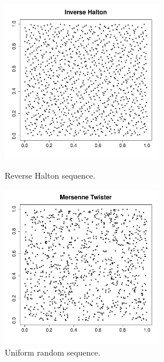 \begin{figure}[H]
  \begin{minipage}{10cm}
    \begin{center}
      \includegraphics[width=7cm]{reverseHalton_cloud.pdf}
      \caption{Reverse Halton sequence.}
      \label{ReverseHalton}
    \end{center}
  \end{minipage}
  \hfill
  \begin{minipage}{10cm}
    \begin{center}
      \includegraphics[width=7cm]{mersenne_twister_cloud.pdf}
      \caption{Uniform random sequence.}
      \label{Uniform}
    \end{center}
  \end{minipage}
\end{figure}
